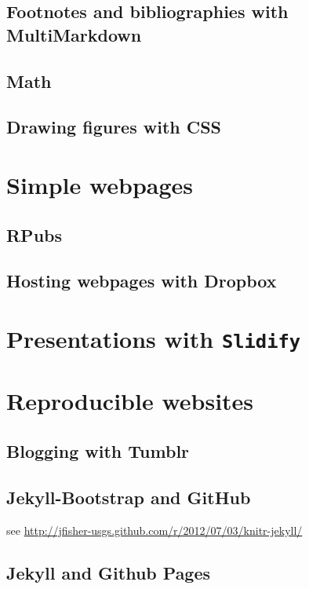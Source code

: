 \documentclass[ChapterTOCs,krantz1]{krantz}\usepackage{graphicx, color}
\begin{document}
\subsection{Footnotes and bibliographies with MultiMarkdown}

\subsection{Math}

\subsection{Drawing figures with CSS}

\section{Simple webpages}

\subsection{RPubs}

\subsection{Hosting webpages with Dropbox}

\section{Presentations with \texttt{Slidify}}

\section{Reproducible websites}

\subsection{Blogging with Tumblr}

\subsection{Jekyll-Bootstrap and GitHub}

see \url{http://jfisher-usgs.github.com/r/2012/07/03/knitr-jekyll/}

\subsection{Jekyll and Github Pages}
\end{document}
